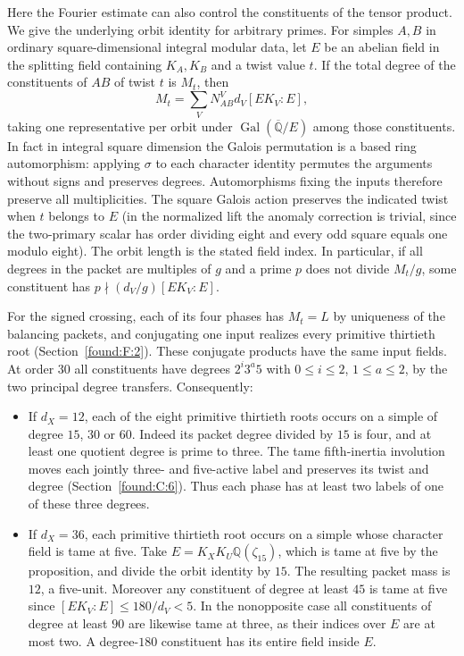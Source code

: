 \documentclass[11pt,a4paper]{article}
\numberwithin{equation}{section}
\theoremstyle{remark}
\begin{document}
Here the Fourier estimate can also control the constituents of the tensor product. We give the underlying orbit identity for arbitrary primes. For simples $A,B$ in ordinary square-dimensional integral modular data, let $E$ be an abelian field in the splitting field containing $K_A,K_B$ and a twist value $t$. If the total degree of the constituents of $AB$ of twist $t$ is $M_t$, then
\[
 M_t=\sum_V N_{AB}^V d_V [EK_V:E],
\]
taking one representative per orbit under $\operatorname{Gal}(\overline{\mathbb Q}/E)$ among those constituents. In fact in integral square dimension the Galois permutation is a based ring automorphism: applying $\sigma$ to each character identity permutes the arguments without signs and preserves degrees. Automorphisms fixing the inputs therefore preserve all multiplicities. The square Galois action preserves the indicated twist when $t$ belongs to $E$ (in the normalized lift the anomaly correction is trivial, since the two-primary scalar has order dividing eight and every odd square equals one modulo eight). The orbit length is the stated field index. In particular, if all degrees in the packet are multiples of $g$ and a prime $p$ does not divide $M_t/g$, some constituent has $p\nmid (d_V/g)[EK_V:E]$.

For the signed crossing, each of its four phases has $M_t=L$ by uniqueness of the balancing packets, and conjugating one input realizes every primitive thirtieth root (Section~\ref{found:F:2}). These conjugate products have the same input fields. At order $30$ all constituents have degrees $2^i3^a5$ with $0\le i\le2$, $1\le a\le2$, by the two principal degree transfers. Consequently:
\begin{itemize}
\item If $d_X=12$, each of the eight primitive thirtieth roots occurs on a simple of degree $15$, $30$ or $60$. Indeed its packet degree divided by $15$ is four, and at least one quotient degree is prime to three. The tame fifth-inertia involution moves each jointly three- and five-active label and preserves its twist and degree (Section~\ref{found:C:6}). Thus each phase has at least two labels of one of these three degrees.
\item If $d_X=36$, each primitive thirtieth root occurs on a simple whose character field is tame at five. Take $E=K_XK_U\mathbb Q(\zeta_{15})$, which is tame at five by the proposition, and divide the orbit identity by $15$. The resulting packet mass is $12$, a five-unit. Moreover any constituent of degree at least $45$ is tame at five since $[EK_V:E]\le180/d_V<5$. In the nonopposite case all constituents of degree at least $90$ are likewise tame at three, as their indices over $E$ are at most two. A degree-$180$ constituent has its entire field inside $E$.
\end{itemize}
\end{document}
